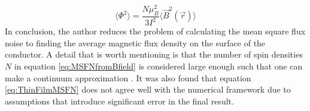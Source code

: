 \begin{equation}
    \langle \Phi^2 \rangle = \frac{N\mu_B^2}{3I^2}\langle \Vec{B}^2(\Vec{r}) \rangle
    \label{eq:MSFNfromBfield}
\end{equation}
In conclusion, the author reduces the problem of calculating the mean square flux noise to finding the average magnetic flux density on the surface of the conductor. A detail that is worth mentioning is that the number of spin densities $N$ in equation \ref{eq:MSFNfromBfield} is considered large enough such that one can make a continuum approximation \cite{fluxNoiseSquidsStevenAnton}. It was also found that equation \ref{eq:ThinFilmMSFN} does not agree well with the numerical framework due to assumptions that introduce significant error in the final result.

